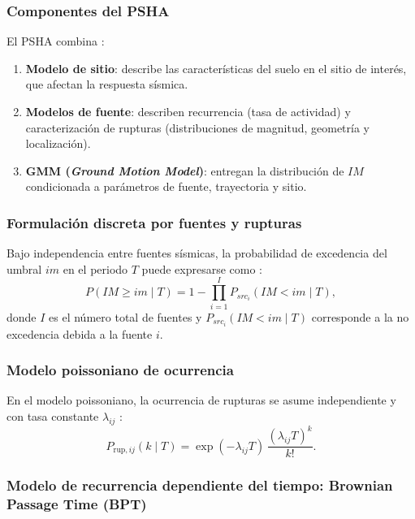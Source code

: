 \subsubsection{Componentes del PSHA}

El PSHA combina \cite{Cornell1968}:
\begin{enumerate}
    \item \textbf{Modelo de sitio}: describe las características del suelo en el sitio de interés, que afectan la respuesta sísmica.
    \item \textbf{Modelos de fuente}: describen recurrencia (tasa de actividad) y caracterización de rupturas (distribuciones de magnitud, geometría y localización).
    \item \textbf{GMM (\textit{Ground Motion Model})}: entregan la distribución de \(IM\) condicionada a parámetros de fuente, trayectoria y sitio.
\end{enumerate}

\subsubsection{Formulación discreta por fuentes y rupturas}

Bajo independencia entre fuentes sísmicas, la probabilidad de excedencia del umbral \(im\) en el periodo \(T\) puede expresarse como \cite{McGuire2004}:
\begin{equation}
P(IM \geq im \mid T) = 1 - \prod_{i=1}^{I} P_{src_i}(IM < im \mid T),
\label{eq:prob_exceedance_sources_v2}
\end{equation}
donde \(I\) es el número total de fuentes y \(P_{src_i}(IM<im\mid T)\) corresponde a la no excedencia debida a la fuente \(i\).

\subsubsection{Modelo poissoniano de ocurrencia}

En el modelo poissoniano, la ocurrencia de rupturas se asume independiente y con tasa constante \(\lambda_{ij}\) \cite{Cornell1968,McGuire2004}:
\begin{equation}
P_{\text{rup},ij}(k \mid T) = \exp(-\lambda_{ij}T)\,\frac{(\lambda_{ij}T)^k}{k!}.
\label{eq:poisson_prob_k_occurrences_v2}
\end{equation}

\subsubsection{Modelo de recurrencia dependiente del tiempo: Brownian Passage Time (BPT)}

